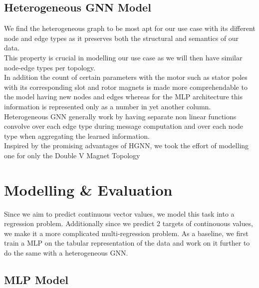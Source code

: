 \documentclass{report} %
\begin{document}



\section{Heterogeneous \ac{GNN} Model}\label{sec:Heterogeneous GNN Model}

We find the heterogeneous graph to be most apt for our use case with its different node and edge types as it preserves both the structural and semantics of our data. \\
This property is crucial in modelling our use case as we will then have similar node-edge types per topology. \\
In addition the count of certain parameters with the motor such as stator poles with its corresponding slot and rotor magnets is made more comprehendable to the model having new nodes and edges whereas for the \ac{MLP} architecture this information is represented only as a number in yet another column. \\
Heterogeneous \ac{GNN} generally work by having separate non linear functions convolve over each edge type during message computation and over each node type when aggregating the learned information. \\

Inspired by the promising advantages of HGNN, we took the effort of modelling one for only the Double V Magnet Topology

\newpage 
\chapter{Modelling \& Evaluation}

Since we aim to predict continuous vector values, we model this task into a regression problem. Additionally since we predict 2 targets of continouous values, we make it a more complicated multi-regression problem.
As a baseline, we first train a \ac{MLP} on the tabular representation of the data and work on it further to do the same with a heterogeneous \ac{GNN}.

\section{\ac{MLP} Model}\label{sec:MLP Model}
\end{document}
